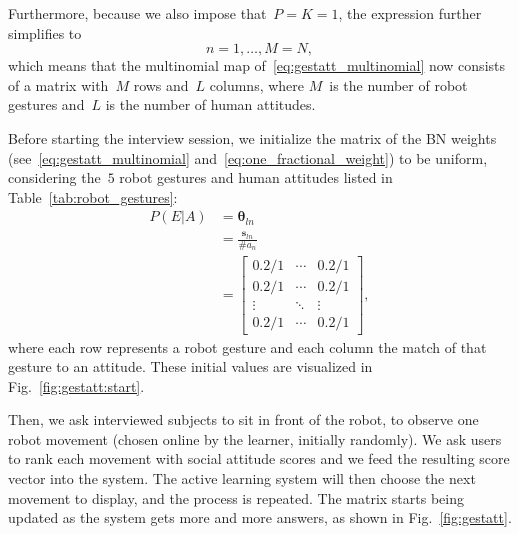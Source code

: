 Furthermore, because we also impose that~$P = K = 1$, the expression further simplifies to
\begin{equation*}
n = 1, \ldots, M=N,
\end{equation*}
which means that the multinomial map of~\eqref{eq:gestatt_multinomial} now consists of a matrix with~$M$ rows and~$L$ columns, where $M$~is the number of robot gestures and~$L$ is the number of human attitudes.

Before starting the interview session, we initialize the matrix of the \acl{BN} weights (see~\eqref{eq:gestatt_multinomial} and~\eqref{eq:one_fractional_weight}) to be uniform, considering the~$5$ robot gestures and human attitudes listed in Table~\ref{tab:robot_gestures}:
\begin{equation*}
\begin{split}
P(E | A) &= \bm{\theta}_{ln} \\
         &= \frac{\bm{s}_{ln}}{\#a_n} \\
         &= \begin{bmatrix}
            0.2/1  & \cdots & 0.2/1 \\
            0.2/1  & \cdots & 0.2/1 \\
            \vdots & \ddots & \vdots \\
            0.2/1  & \cdots & 0.2/1
            \end{bmatrix},
\end{split}
\end{equation*}
where each row represents a robot gesture and each column the match of that gesture to an attitude. These initial values are visualized in Fig.~\ref{fig:gestatt:start}.

Then, we ask interviewed subjects to sit in front of the robot, to observe one robot movement (chosen online by the learner, initially randomly).
We ask users to rank each movement with social attitude scores and we feed the resulting score vector into the system.
The active learning system will then choose the next movement to display, and the process is repeated.
The matrix starts being updated as the system gets more and more answers, as shown in Fig.~\ref{fig:gestatt}.

